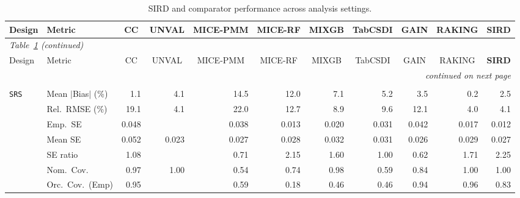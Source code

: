 \begin{landscape}
\footnotesize\setlength{\tabcolsep}{3.5pt}
\begin{longtable}{llrrrrrrrrr}
\caption{SIRD and comparator performance across analysis settings.}
\label{tab:appc_vccc_LM} \\
\toprule
Design & Metric & \multicolumn{1}{c}{CC} & \multicolumn{1}{c}{UNVAL} & \multicolumn{1}{c}{MICE-PMM} & \multicolumn{1}{c}{MICE-RF} & \multicolumn{1}{c}{MIXGB} & \multicolumn{1}{c}{TabCSDI} & \multicolumn{1}{c}{GAIN} & \multicolumn{1}{c}{RAKING} & \multicolumn{1}{c}{\textbf{SIRD}} \\
\midrule \endfirsthead
\multicolumn{11}{l}{\footnotesize\itshape Table~\ref{tab:appc_vccc_LM} (continued)} \\
\toprule
Design & Metric & \multicolumn{1}{c}{CC} & \multicolumn{1}{c}{UNVAL} & \multicolumn{1}{c}{MICE-PMM} & \multicolumn{1}{c}{MICE-RF} & \multicolumn{1}{c}{MIXGB} & \multicolumn{1}{c}{TabCSDI} & \multicolumn{1}{c}{GAIN} & \multicolumn{1}{c}{RAKING} & \multicolumn{1}{c}{\textbf{SIRD}} \\
\midrule \endhead
\midrule \multicolumn{11}{r}{\footnotesize\itshape continued on next page} \\
\endfoot
\bottomrule \endlastfoot
\multicolumn{11}{l}{\textbf{Continuous Phase-Two Covariates}} \\
\addlinespace[2pt]
\quad \texttt{SRS} & Mean $|$Bias$|$ (\%) & \cellcolor{ranktwo}1.1 & 4.1 & 14.5 & 12.0 & 7.1 & 5.2 & 3.5 & \cellcolor{rankone}0.2 & \cellcolor{rankthree}2.5 \\
 & Rel.\ RMSE (\%) & 19.1 & \cellcolor{ranktwo}4.1 & 22.0 & 12.7 & \cellcolor{rankthree}8.9 & 9.6 & 12.1 & \cellcolor{rankone}4.0 & \cellcolor{ranktwo}4.1 \\
 & Emp.\ SE & 0.048 &  & 0.038 & 0.013 & 0.020 & 0.031 & 0.042 & 0.017 & 0.012 \\
 & Mean SE & 0.052 & 0.023 & 0.027 & 0.028 & 0.032 & 0.031 & 0.026 & 0.029 & 0.027 \\
 & SE ratio & \cellcolor{ranktwo}1.08 &  & \cellcolor{rankthree}0.71 & 2.15 & 1.60 & \cellcolor{rankone}1.00 & 0.62 & 1.71 & 2.25 \\
 & Nom.\ Cov. & \cellcolor{rankone}0.97 & \cellcolor{rankthree}1.00 & 0.54 & 0.74 & \cellcolor{ranktwo}0.98 & 0.59 & 0.84 & \cellcolor{rankthree}1.00 & \cellcolor{rankthree}1.00 \\
 & Orc.\ Cov.\ (Emp) & \cellcolor{rankone}0.95 &  & 0.59 & 0.18 & 0.46 & 0.46 & \cellcolor{ranktwo}0.94 & \cellcolor{ranktwo}0.96 & \cellcolor{rankthree}0.83 \\

\end{longtable}
\end{landscape}

